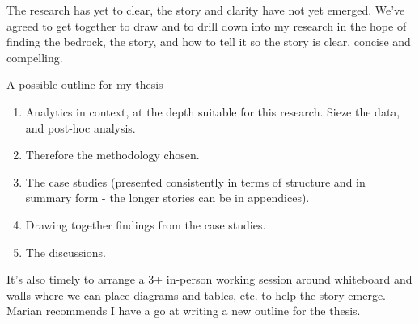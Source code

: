 The research has yet to clear, the story and clarity have not yet emerged. We've agreed to get together to draw and to drill down into my research in the hope of finding the bedrock, the story, and how to tell it so the story is clear, concise and compelling.

A possible outline for my thesis
\begin{enumerate}
    \item Analytics in context, at the depth suitable for this research. Sieze the data, and post-hoc analysis. 
    \item Therefore the methodology chosen.
    \item The case studies (presented consistently in terms of structure and in summary form - the longer stories can be in appendices).
    \item Drawing together findings from the case studies.
    \item The discussions. 
\end{enumerate}

It's also timely to arrange a 3+ in-person working session around whiteboard and walls where we can place diagrams and tables, etc. to help the story emerge. 
Marian recommends I have a go at writing a new outline for the thesis. 
\dotfill
\clearpage